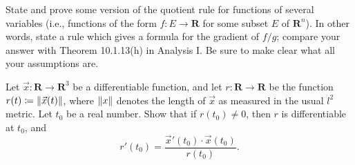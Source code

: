 \begin{exercise}\label{ex 6.4.4}
    State and prove some version of the quotient rule for functions of several variables (i.e., functions of the form \(f : E \to \mathbf{R}\) for some subset \(E\) of \(\mathbf{R}^n\)).
    In other words, state a rule which gives a formula for the gradient of \(f / g\);
    compare your answer with Theorem 10.1.13(h) in Analysis I.
    Be sure to make clear what all your assumptions are.
\end{exercise}

\begin{exercise}\label{ex 6.4.5}
    Let \(\vec{x} : \mathbf{R} \to \mathbf{R}^3\) be a differentiable function, and let \(r : \mathbf{R} \to \mathbf{R}\) be the function \(r(t) \coloneqq \norm*{\vec{x}(t)}\), where \(\norm*{x}\) denotes the length of \(\vec{x}\) as measured in the usual \(l^2\) metric.
    Let \(t_0\) be a real number.
    Show that if \(r(t_0) \neq 0\), then \(r\) is differentiable at \(t_0\), and
    \[
        r'(t_0) = \frac{\vec{x}'(t_0) \cdot \vec{x}(t_0)}{r(t_0)}.
    \]
\end{exercise}